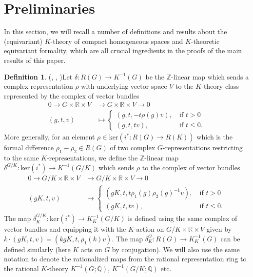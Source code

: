 \documentclass[11pt]{amsart}
\theoremstyle{plain}
\theoremstyle{definition}
\newtheorem{definition}[theorem]{Definition}
\begin{document}
\section{Preliminaries}
In this section, we will recall a number of definitions and results about the (equivariant) $K$-theory of compact homogeneous spaces and $K$-theoretic equivariant formality, which are all crucial ingredients in the proofs of the main results of this paper.
\begin{definition}(\cite[\S I.4]{Ho}, \cite[\S 3]{BZ}, \cite[Definitions 2.2 and 2.5]{F})\label{deltaconstruction}
	Let $\delta: R(G)\to K^{-1}(G)$ be the $\mathbb{Z}$-linear map which sends a complex representation $\rho$ with underlying vector space $V$ to the $K$-theory class represented by the complex of vector bundles
	\begin{align*}
		0\longrightarrow G\times\mathbb{R}\times V&\longrightarrow G\times\mathbb{R}\times V\longrightarrow 0\\
		(g, t, v)&\mapsto\begin{cases}(g, t, -t\rho(g)v),&\ \text{if }t>0\\ (g, t, tv),&\ \text{if }t\leq 0.\end{cases}
	\end{align*}
	More generally, for an element $\rho\in\text{ker}(i^*: R(G)\to R(K))$ which is the formal difference $\rho_1-\rho_2\in R(G)$ of two complex $G$-representations restricting to the same $K$-representations, we define the $\mathbb{Z}$-linear map $\delta^{G/K}:\text{ker}(i^*)\to K^{-1}(G/K)$ which sends $\rho$ to the complex of vector bundles
	\begin{align*}
		0\longrightarrow G/K\times\mathbb{R}\times V&\longrightarrow G/K\times\mathbb{R}\times V\longrightarrow 0\\
		(gK, t, v)&\mapsto\begin{cases}(gK, t, t\rho_1(g)\rho_2(g)^{-1}v),&\ \text{if }t>0\\ (gK, t, tv),&\ \text{if }t\leq 0.\end{cases}
	\end{align*}
	The map $\delta_K^{G/K}: \text{ker}(i^*)\to K_K^{-1}(G/K)$ is defined using the same complex of vector bundles and equipping it with the $K$-action on $G/K\times \mathbb{R}\times V$ given by $k\cdot(gK, t, v)=(kgK, t, \rho_1(k)v)$. The map $\delta_K^G: R(G)\to K_K^{-1}(G)$ can be defined similarly (here $K$ acts on $G$ by conjugation). We will also use the same notation to denote the rationalized maps from the rational representation ring to the rational $K$-theory $K^{-1}(G; \mathbb{Q})$, $K^{-1}(G/K; \mathbb{Q})$ etc.
\end{definition}
\end{document}
